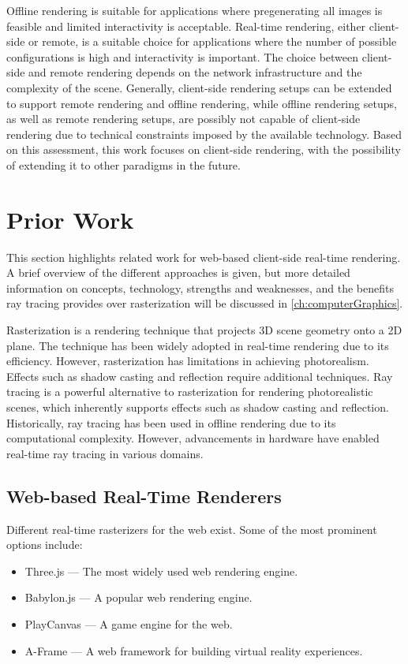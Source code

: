 Offline rendering is suitable for applications where pregenerating all images is feasible and limited interactivity is acceptable. Real-time rendering, either client-side or remote, is a suitable choice for applications where the number of possible configurations is high and interactivity is important. The choice between client-side and remote rendering depends on the network infrastructure and the complexity of the scene.
Generally, client-side rendering setups can be extended to support remote rendering and offline rendering, while offline rendering setups, as well as remote rendering setups, are possibly not capable of client-side rendering due to technical constraints imposed by the available technology. Based on this assessment, this work focuses on client-side rendering, with the possibility of extending it to other paradigms in the future.

\section{Prior Work}

This section highlights related work for web-based client-side real-time rendering. A brief overview of the different approaches is given, but more detailed information on concepts, technology, strengths and weaknesses, and the benefits ray tracing provides over rasterization will be discussed in \autoref{ch:computerGraphics}.

Rasterization is a rendering technique that projects 3D scene geometry onto a 2D plane. The technique has been widely adopted in real-time rendering due to its efficiency. However, rasterization has limitations in achieving photorealism. Effects such as shadow casting and reflection require additional techniques. Ray tracing is a powerful alternative to rasterization for rendering photorealistic scenes, which inherently supports effects such as shadow casting and reflection. Historically, ray tracing has been used in offline rendering due to its computational complexity. However, advancements in hardware have enabled real-time ray tracing in various domains.

\subsection*{Web-based Real-Time Renderers}

Different real-time rasterizers for the web exist. Some of the most prominent options include:

\begin{itemize}
  \item {\gls{Three.js}} \cite{threeJSWebsite} — The most widely used web rendering engine.
  \item {\gls{Babylon.js}} \cite{babylonJSWebsite} — A popular web rendering engine.
  \item {\gls{PlayCanvas}} \cite{playCanvasWebsite} — A game engine for the web.
  \item {\gls{A-Frame}} \cite{aFrameWebsite} — A web framework for building virtual reality experiences.
\end{itemize}

